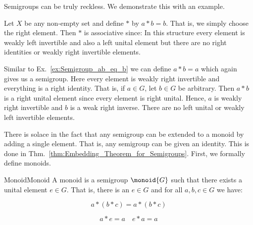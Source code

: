        Semigroups can be truly reckless. We demonstrate this with an example.
        \begin{example}
            \label{ex:Semigroup_ab_eq_b}%
            Let $X$ be any non-empty set and define $*$ by $a*b=b$. That is, we
            simply choose the right element. Then $*$ is associative since:
            \vspace{-2.5ex}
            In this structure every element is weakly left invertible and also
            a left unital element but there are no right identities or weakly
            right invertible elements.
        \end{example}
        \begin{example}
            \label{ex:Semigroup_ab_eq_a}%
            Similar to Ex.~\ref{ex:Semigroup_ab_eq_b} we can define $a*b=a$
            which again gives us a semigroup. Here every element is weakly right
            invertible and everything is a right identity. That is, if
            $a\in{G}$, let $b\in{G}$ be arbitrary. Then $a*b$ is a right unital
            element since every element is right unital. Hence, $a$ is weakly
            right invertible and $b$ is a weak right inverse. There are no
            left unital or weakly left invertible elements.
        \end{example}
        There is solace in the fact that any semigroup can be extended to a
        monoid by adding a single element. That is, any semigroup can be given
        an identity. This is done in
        Thm.~\ref{thm:Embedding_Theorem_for_Semigroups}. First, we formally
        define monoids.
        \begin{fdefinition}{Monoid}{Monoid}
            A \gls{monoid} is a \gls{semigroup} $\monoid{G}$ such that there
            exists a \gls{unital element} $e\in{G}$. That is, there is an
            $e\in{G}$ and for all $a,b,c\in{G}$ we have:
            \par\vspace{-2.5ex}
            \begin{minipage}[t]{0.49\textwidth}
                \centering
                \begin{equation}
                    \label{eqn:Monoid_Associativity}
                    a*(b*c)=a*(b*c)\tag{1}
                \end{equation}
            \end{minipage}
            \hfill
            \begin{minipage}[t]{0.49\textwidth}
                \centering
                \begin{equation}
                    \label{eqn:Monoid_Identity}
                    a*e=a\quad
                    e*a=a\tag{2}
                \end{equation}
            \end{minipage}
        \end{fdefinition}
